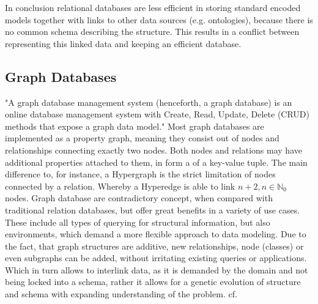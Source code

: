 In conclusion relational databases are less efficient in storing standard encoded models together with links to other data sources (e.g. ontologies), because there is no common schema describing the structure. This results in a conflict between representing this linked data and keeping an efficient database. \cite{Henkel2015}

\subsection{Graph Databases}
\label{sec:background:graph-db:neo4j}
"A graph database management system (henceforth, a graph database) is an online database management system with Create, Read, Update, Delete (CRUD) methods that expose a graph data model." \cite{Robinson2013}
Most graph databases are implemented as a property graph, meaning they consist out of nodes and relationships connecting exactly two nodes. Both nodes and relations may have additional properties attached to them, in form a of a key-value tuple.
The main difference to, for instance, a Hypergraph is the strict limitation of nodes connected by a relation. Whereby a Hyperedge is able to link $n+2, n \in \mathbb{N}_0$ nodes. \cite[Appendix A]{Robinson2013}
Graph database are contradictory concept, when compared with traditional relation databases, but offer great benefits in a variety of use cases. These include all types of querying for structural information, but also environments, which demand a more flexible approach to data modeling. 
Due to the fact, that graph structures are additive, new relationships, node (classes) or even subgraphs can be added, without irritating existing queries or applications. Which in turn allows to interlink data, as it is demanded by the domain and not being locked into a schema, rather it allows for a genetic evolution of structure and schema with expanding understanding of the problem. cf. \cite{Robinson2013}

